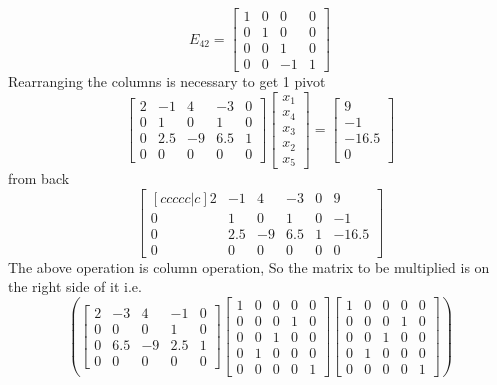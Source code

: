 \documentclass[11pt,a4paper]{article}
\begin{document}
\[
E_{42} = \begin{bmatrix}
            1 & 0 & 0 & 0\\ 
            0 & 1 & 0 & 0\\ 
            0 & 0 & 1 & 0\\ 
            0 & 0 & -1 & 1 
         \end{bmatrix}
\]
Rearranging the columns is necessary to get 1 pivot
\[
    \begin{bmatrix}
        2 & -1    & 4  & -3  & 0\\
        0 & 1     & 0  & 1   & 0\\
        0 & 2.5   & -9 & 6.5 & 1\\
        0 & 0     & 0  & 0   & 0 
    \end{bmatrix} \begin{bmatrix}
                    x_1 \\ x_4 \\ x_3 \\ x_2 \\ x_5
                 \end{bmatrix} = \begin{bmatrix}
                                    9 \\ -1 \\ -16.5 \\ 0
                                 \end{bmatrix}
\]
from back 
\[
\begin{bmatrix}[ccccc|c]
        2 & -1    & 4  & -3  & 0 & 9\\
        0 & 1     & 0  & 1   & 0 & -1\\
        0 & 2.5   & -9 & 6.5 & 1 & -16.5\\
        0 & 0     & 0  & 0   & 0 & 0
\end{bmatrix}
\]
The above operation is column operation, So the matrix to be multiplied is on the right side of it i.e.
\[
(
\begin{bmatrix}
   2 & -3 & 4 & -1 & 0\\
   0 & 0 & 0 & 1 & 0\\
   0 & 6.5 & -9 & 2.5 & 1\\
   0 & 0 & 0 & 0 & 0
\end{bmatrix} \begin{bmatrix}
                1 & 0 & 0 & 0 & 0\\
                0 & 0 & 0 & 1 & 0\\
                0 & 0 & 1 & 0 & 0\\
                0 & 1 & 0 & 0 & 0\\
                0 & 0 & 0 & 0 & 1
              \end{bmatrix} \begin{bmatrix}
                                1 & 0 & 0 & 0 & 0\\
                                0 & 0 & 0 & 1 & 0\\
                                0 & 0 & 1 & 0 & 0\\
                                0 & 1 & 0 & 0 & 0\\
                                0 & 0 & 0 & 0 & 1
                              \end{bmatrix}
)
\]
\end{document}
